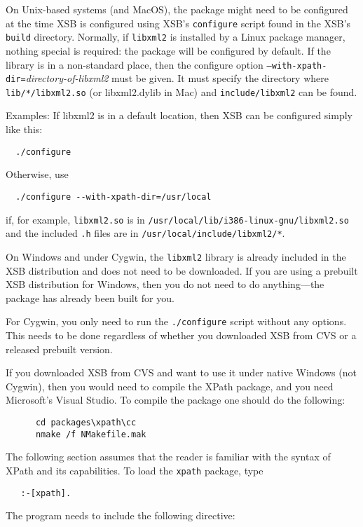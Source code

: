 On Unix-based systems (and MacOS), the package might need to be configured at
the time XSB is configured using XSB's
{\tt configure} script found in the XSB's {\tt build} directory.
Normally, if {\tt libxml2} is installed by a Linux package manager, nothing
special is required: the package will be configured by default.
If the library is in a non-standard place, then the configure option
\texttt{--with-xpath-dir=}{\em directory-of-libxml2}
must be given. It
must specify the directory where {\tt lib/*/libxml2.so} (or libxml2.dylib
in Mac) and \texttt{include/libxml2} can be found.

Examples: If libxml2 is in a default location, then XSB can be configured
simply like this:
\begin{verbatim}
  ./configure 
\end{verbatim}
Otherwise, use
\begin{verbatim}
  ./configure --with-xpath-dir=/usr/local
\end{verbatim}
if, for example, {\tt libxml2.so} is in {\tt /usr/local/lib/i386-linux-gnu/libxml2.so} and
the included {\tt .h}  files are in {\tt /usr/local/include/libxml2/*}. 

On Windows and under Cygwin, the {\tt libxml2} library is already included
in the XSB distribution and does not need to be downloaded. If you are
using a prebuilt XSB distribution for Windows, then you do not need to do
anything---the package has already been built for you.

For Cygwin, you only need to run the {\tt ./configure} script without any
options. This needs to be done regardless of whether you downloaded XSB
from CVS or a released prebuilt version. 

If you downloaded XSB from CVS and want to use it under native Windows (not
Cygwin), then you would need to compile the XPath package, and you
need Microsoft's Visual Studio.  To compile the package one should do the
following:
\begin{verbatim}
      cd packages\xpath\cc
      nmake /f NMakefile.mak  
\end{verbatim}


The following section assumes that the reader is familiar with the syntax
of XPath and its capabilities.  To load the {\tt xpath} package, type
\begin{verbatim}
   :-[xpath]. 
\end{verbatim}


The program needs to include the following directive:


